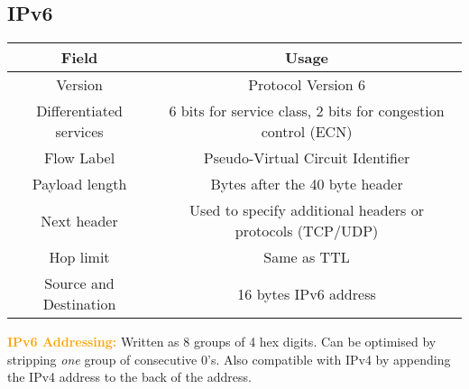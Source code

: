 \documentclass[a4paper,10pt]{article}
\begin{document}
\subsection{IPv6}
\begin{center}
	\begin{tabular}{|c|c|}
		\hline 
		\textbf{Field} & \textbf{Usage} \\
		\hline
		\hline 
		Version &Protocol Version 6 \\
		\hline 
		Differentiated services &6 bits for service class, 2 bits for congestion control (ECN) \\
		\hline 
		Flow Label &Pseudo-Virtual Circuit Identifier \\
		\hline 
		Payload length &Bytes after the 40 byte header \\ 
		\hline 
		Next header &Used to specify additional headers or protocols (TCP/UDP) \\
		\hline 
		Hop limit &Same as TTL \\
		\hline
		Source and Destination &16 bytes IPv6 address \\ 
		\hline 
	\end{tabular}
\end{center}
\textcolor{Orange}{\textbf{IPv6 Addressing:}} Written as 8 groups of 4 hex digits. Can be optimised by stripping \emph{one} group of consecutive 0's. Also compatible with IPv4 by appending the IPv4 address to the back of the address.
\end{document}
